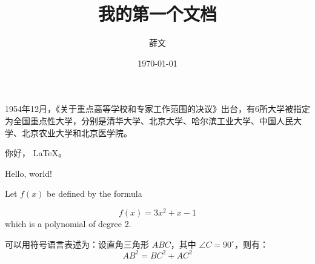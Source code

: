 \documentclass{ctexart} %
\title{\heiti 我的第一个文档}
\author{\kaishu 薛文}
\date{\today}
\newcommand\degree{^\circ}
\begin{document}
	\maketitle
	
	1954年12月，《关于重点高等学校和专家工作范围的决议》出台，有6所大学被指定为全国重点性大学，分别是清华大学、北京大学、哈尔滨工业大学、中国人民大学、北京农业大学和北京医学院。
	
	
	你好， \LaTeX 。
	
	Hello, world!
	
	Let $f(x)$ be defined by the formula
	
	$$f(x)=3x^2+x-1$$ which is a polynomial of degree 2.
	
	可以用符号语言表述为：设直角三角形 $ABC$，其中 $\angle C=90\degree$，则有：
	\begin{equation}
		AB^2 = BC^2 + AC^2
	\end{equation}
\end{document}
